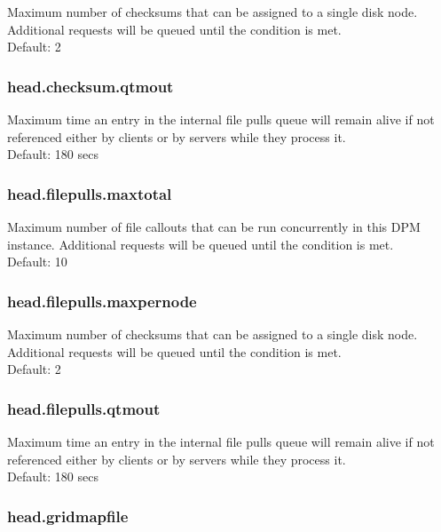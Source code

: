 \documentclass[a4paper,10pt]{scrreprt}
\begin{document}
Maximum number of checksums that can be assigned to a single disk node. Additional requests will be queued until the condition is met.\\
Default: 2\\


\subsubsection{head.checksum.qtmout}

Maximum time an entry in the internal file pulls queue will remain alive if not referenced either by clients or by servers while they process it.\\
Default: 180 secs\\




\subsubsection{head.filepulls.maxtotal}

Maximum number of file callouts that can be run concurrently in this DPM instance. Additional requests will be queued until the condition is met.\\
Default: 10\\

\subsubsection{head.filepulls.maxpernode}

Maximum number of checksums that can be assigned to a single disk node. Additional requests will be queued until the condition is met.\\
Default: 2\\


\subsubsection{head.filepulls.qtmout}

Maximum time an entry in the internal file pulls queue will remain alive if not referenced either by clients or by servers while they process it.\\
Default: 180 secs\\


\subsubsection{head.gridmapfile}
\end{document}
